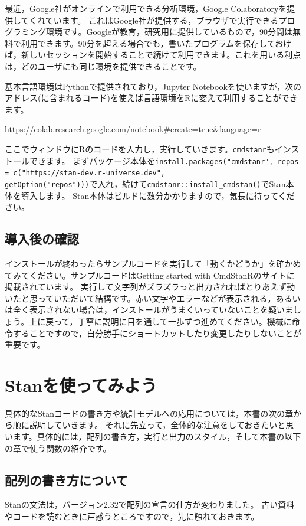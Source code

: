 \documentclass{ltjsbook}
\begin{document}
最近，Google社がオンラインで利用できる分析環境，Google Colaboratoryを提供してくれています。
これはGoogle社が提供する，ブラウザで実行できるプログラミング環境です。Googleが教育，研究用に提供しているもので，90分間は無料で利用できます。90分を超える場合でも，書いたプログラムを保存しておけば，新しいセッションを開始することで続けて利用できます。これを用いる利点は，どのユーザにも同じ環境を提供できることです。

基本言語環境はPythonで提供されており，Jupyter Notebookを使いますが，次のアドレス(に含まれるコード)を使えば言語環境をRに変えて利用することができます。
\begin{center}
	\url{https://colab.research.google.com/notebook#create=true&language=r}
\end{center}

ここでウィンドウにRのコードを入力し，実行していきます。\texttt{cmdstanr}もインストールできます。
まずパッケージ本体を\verb|install.packages("cmdstanr", repos = c("https://stan-dev.r-universe.dev",|\\
\verb|getOption("repos")))|で入れ，続けて\verb|cmdstanr::install_cmdstan()|でStan本体を導入します。
Stan本体はビルドに数分かかりますので，気長に待ってください。

\subsection{導入後の確認}
インストールが終わったらサンプルコードを実行して「動くかどうか」を確かめてみてください。サンプルコードはGetting started with CmdStanRのサイトに掲載されています。
実行して文字列がズラズラっと出力されればとりあえず動いたと思っていただいて結構です。赤い文字やエラーなどが表示される，あるいは全く表示されない場合は，インストールがうまくいっていないことを疑いましょう。上に戻って，丁寧に説明に目を通して一歩ずつ進めてください。機械に命令することですので，自分勝手にショートカットしたり変更したりしないことが重要です。
\section{Stanを使ってみよう}
具体的なStanコードの書き方や統計モデルへの応用については，本書の次の章から順に説明していきます。
それに先立って，全体的な注意をしておきたいと思います。具体的には，配列の書き方，実行と出力のスタイル，そして本書の以下の章で使う関数の紹介です。

\subsection{配列の書き方について}
Stanの文法は，バージョン2.32で配列の宣言の仕方が変わりました。
古い資料やコードを読むときに戸惑うところですので，先に触れておきます。
\end{document}
